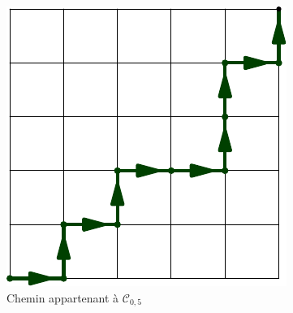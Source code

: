 \begin{figure}[h!t]
 \centering
 \includegraphics{./Enbcat_1.pdf}
 \caption{Chemin appartenant à $\mathcal{C}_{0,5}$}
 \label{fig: Enbcat_1}
\end{figure}
  
